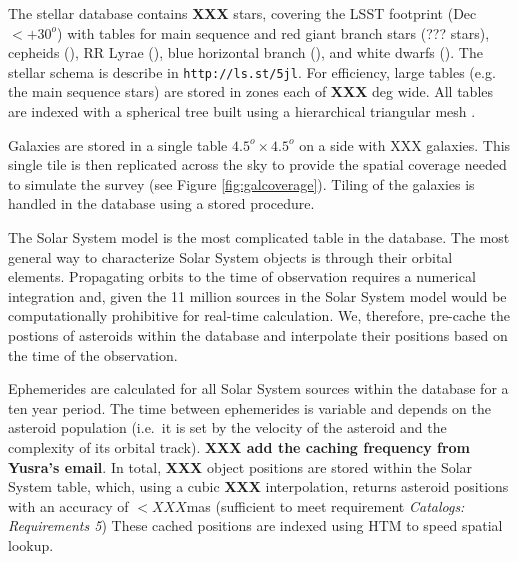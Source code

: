 \documentclass[]{article}
\begin{document}
The stellar database contains {\bf XXX} stars, covering the LSST
footprint (Dec $< +30^o$) with tables for main sequence and red giant
branch stars (??? stars), cepheids (), RR Lyrae (), blue horizontal
branch (), and white dwarfs ().  The stellar schema is describe in
{\tt http://ls.st/5jl}. For efficiency, large tables (e.g. the main
sequence stars) are stored in zones each of {\bf XXX} deg wide.  All
tables are indexed with a spherical tree built using a hierarchical
triangular mesh \citep[HTM][]{htm}.

Galaxies are stored in a single table $4.5^o \times 4.5^o$ on a side
with XXX galaxies. This single tile is then replicated across the sky
to provide the spatial coverage needed to simulate the survey (see
Figure \ref{fig:galcoverage}).  Tiling of the galaxies is handled in
the database using a stored procedure. %

The Solar System model is the most complicated table in the
database. The most general way to characterize Solar System objects is
through their orbital elements.  Propagating orbits to the time of
observation requires a numerical integration and, given the 11 million
sources in the Solar System model would be computationally prohibitive
for real-time calculation. We, therefore, pre-cache the postions of
asteroids within the database and interpolate their positions based on
the time of the observation.

Ephemerides are calculated for all Solar System sources within the
database for a ten year period. The time between ephemerides is
variable and depends on the asteroid population (i.e.\ it is set by
the velocity of the asteroid and the complexity of its orbital track).
{\bf XXX add the caching frequency from Yusra's email}. In total, {\bf
  XXX} object positions are stored within the Solar System table,
which, using a cubic {\bf XXX} interpolation, returns asteroid
positions with an accuracy of $<XXX$mas (sufficient to meet
requirement {\it Catalogs: Requirements 5}) These cached positions are
indexed using HTM \citep{XXX} to speed spatial lookup.

\end{document}
